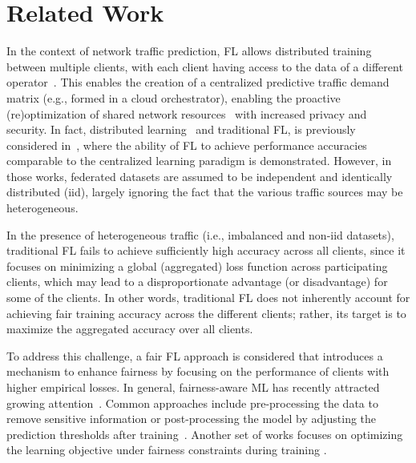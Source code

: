 \section{Related Work}
In the context of network traffic prediction, FL allows distributed training between multiple clients, with each client having access to the data of a different operator~\cite{sepasgozar2022fed,li2024core}. This enables the creation of a centralized predictive traffic demand matrix (e.g., formed in a cloud orchestrator), enabling the proactive (re)optimization of shared network resources~\cite{9748600} with increased privacy and security. In fact, distributed learning~\cite{Chen:19} and traditional FL, is previously considered in~\cite{behera2024federated,drainakis2023centralized,9306745,9748424,asad2021federated,9605846}, where the ability of FL to achieve performance accuracies comparable to the centralized learning paradigm is demonstrated. However, in those works, federated datasets are assumed to be independent and identically distributed (iid), largely ignoring the fact that the various traffic sources may be heterogeneous.%

In the presence of heterogeneous traffic (i.e., imbalanced and non-iid datasets), traditional FL fails to achieve sufficiently high accuracy across all clients, since it focuses on minimizing a global (aggregated) loss function across participating clients, which may lead to a disproportionate advantage (or disadvantage) for some of the clients. In other words, traditional FL does not inherently account for achieving fair training accuracy across the different clients; rather, its target is to maximize the aggregated accuracy over all clients.


To address this challenge, a fair FL approach is considered that introduces a mechanism to enhance fairness by focusing on the performance of clients with higher empirical losses. In general, fairness-aware ML has recently attracted growing attention~\cite{ezzeldin2023fairfed,salazar2023fair,li2019fair}. Common approaches include pre-processing the data to remove sensitive information or post-processing the model by adjusting the prediction thresholds after training~\cite{hardt2016equality,calmon2017optimized}. Another set of works focuses on optimizing the learning objective under fairness constraints during training \cite{agarwal2018reductions,hashimoto2018fairness,cotter2019optimization}. 

